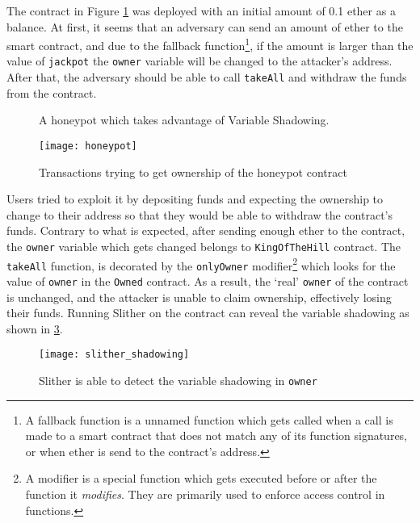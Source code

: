 The contract in Figure \ref{fig:owner_honeypot} was deployed with an initial amount of 0.1 ether as a balance. At first, it seems that an adversary can send an amount of ether to the smart contract, and due to the fallback function\footnote{A fallback function is a unnamed function which gets called when a call is made to a smart contract that does not match any of its function signatures, or when ether is send to the contract's address.}, if the amount is larger than the value of \texttt{jackpot} the \texttt{owner} variable will be changed to the attacker's address. After that, the adversary should be able to call \texttt{takeAll} and withdraw the funds from the contract.

\begin{figure}[ht!]
    \centering
    
    \caption{A honeypot which takes advantage of Variable Shadowing.}
    \label{fig:owner_honeypot}
\end{figure}

\begin{figure}[ht!]
    \centering
    \texttt{[image: honeypot]}
    \caption{Transactions trying to get ownership of the honeypot contract}
    \label{fig:honeypot_tx}
\end{figure}

Users tried to exploit it by depositing funds and expecting the ownership to change to their address so that they would be able to withdraw the contract's funds. Contrary to what is expected, after sending enough ether to the contract, the \texttt{owner} variable which gets changed belongs to \texttt{KingOfTheHill} contract. The \texttt{takeAll} function, is decorated by the \texttt{onlyOwner} modifier\footnote{A modifier is a special function which gets executed before or after the function it \textit{modifies}. They are primarily used to enforce access control in functions.} which looks for the value of \texttt{owner} in the \texttt{Owned} contract. As a result, the `real' \texttt{owner} of the contract is unchanged, and the attacker is unable to claim ownership, effectively losing their funds. Running Slither on the contract can reveal the variable shadowing as shown in \ref{fig:slither_shadowing}.

\begin{figure}[H]
    \centering
    \texttt{[image: slither\_shadowing]}
    \caption{Slither is able to detect the variable shadowing in \texttt{owner}}
    \label{fig:slither_shadowing}
\end{figure}
